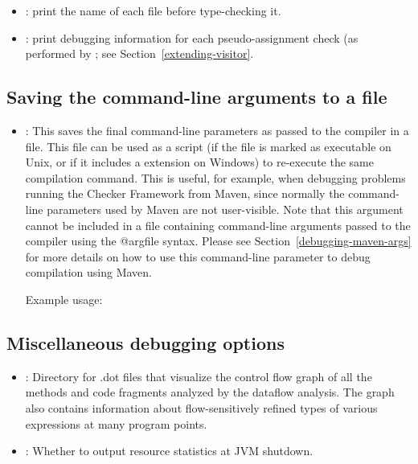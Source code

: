 \begin{itemize}

\item {}: print the name of each file before type-checking it.

\item {}: print debugging information for each
pseudo-assignment check (as performed by
; see
Section~\ref{extending-visitor}.

\end{itemize}

\subsection{Saving the command-line arguments to a file\label{debugging-options-output-args}}

\begin{itemize}

\item {}:
  This saves the final command-line parameters as passed to the compiler in a file.
  This file can be used as a script (if the file is marked as executable on Unix, or
  if it includes a  extension on Windows) to re-execute the same compilation command.
  This is useful, for example, when debugging problems running the Checker Framework from
  Maven, since normally the command-line parameters used by Maven are not user-visible.
  Note that this argument cannot be included in a file containing command-line arguments
  passed to the compiler using the @argfile syntax.  Please see
  Section~\ref{debugging-maven-args} for more details on how to use this command-line
  parameter to debug compilation using Maven.

  Example usage: 

\end{itemize}

\subsection{Miscellaneous debugging options\label{debugging-options-misc}}

\begin{itemize}

\item {}:
  Directory for .dot files that visualize the control flow graph of all the methods and code fragments
  analyzed by the dataflow analysis.  The graph also contains information about flow-sensitively refined
  types of various expressions at many program points.

\item {}:
  Whether to output resource statistics at JVM shutdown.

\end{itemize}


